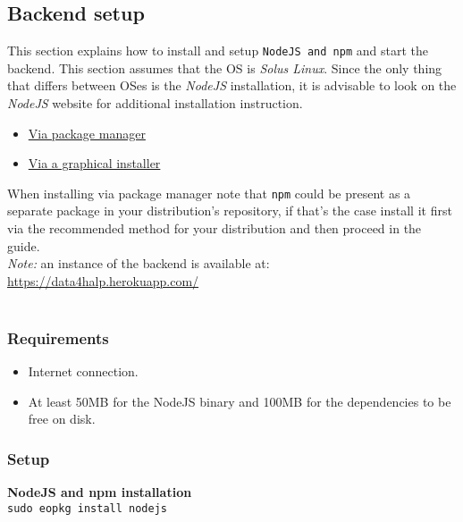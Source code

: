 \subsection{Backend setup}

This section explains how to install and setup \texttt{NodeJS and npm} and start the backend.
This section assumes that the OS is \textit{Solus Linux}. Since the only thing that differs between OSes is the \textit{NodeJS} installation, it is advisable to look on the \textit{NodeJS} website for additional installation instruction.

\begin{itemize}
    \item \href{https://nodejs.org/en/download/package-manager/}{Via package manager}
    \item \href{https://nodejs.org/en/download/}{Via a graphical installer}
\end{itemize}
When installing via package manager note that \texttt{npm} could be present as a separate package in your distribution's repository, if that's the case install it first via the recommended method for your distribution and then proceed in the guide.\\

\noindent \textit{Note:} an instance of the backend is available at: \\
\href{https://data4halp.herokuapp.com/}{https://data4halp.herokuapp.com/} \\
\\

\subsubsection{Requirements}
\begin{itemize}
    \item Internet connection.
    \item At least 50MB for the NodeJS binary and 100MB for the dependencies to be free on disk.
\end{itemize}

\subsubsection{Setup}
\vspace{0.5em}
\noindent \textbf{NodeJS and npm installation}\\
\texttt{sudo eopkg install nodejs}\\
\vspace{0.3em}

